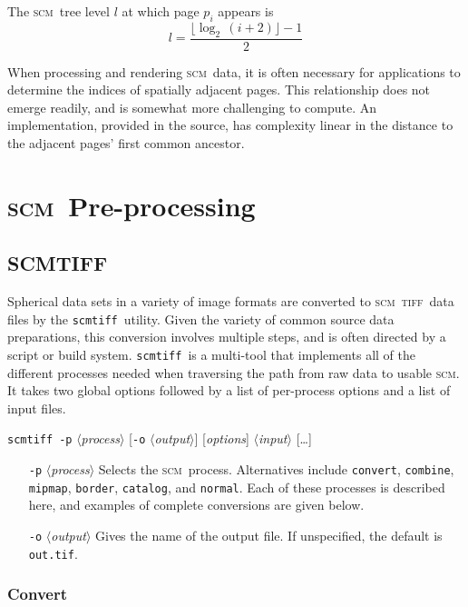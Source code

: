 \documentclass[oneside,11pt]{memoir}
\newcommand{\scm}     {\textsc{scm}}
\newcommand{\tiff}    {\textsc{tiff}}
\newcommand{\scmtiff} {\texttt{scmtiff}}
\newcommand{\inangles}[1]{$\langle$#1$\rangle$}
\begin{document}
\begin{Spacing}{1.1}
The \scm\ tree level $l$ at which page $p_i$ appears is
\[l=\frac{\lfloor\log_2\,(i+2)\rfloor - 1}{2}\]

When processing and rendering \scm\ data, it is often necessary for applications to determine the indices of spatially adjacent pages. This relationship does not emerge readily, and is somewhat more challenging to compute. An implementation, provided in the source, has complexity linear in the distance to the adjacent pages' first common ancestor.

\chapter{\scm\ Pre-processing}

\section{SCMTIFF}

Spherical data sets in a variety of image formats are converted to \scm\ \tiff\ data files by the \scmtiff\ utility. Given the variety of common source data preparations, this conversion involves multiple steps, and is often directed by a script or build system. \scmtiff\ is a multi-tool that implements all of the different processes needed when traversing the path from raw data to usable \scm. It takes two global options followed by a list of per-process options and a list of input files.

\bigskip\noindent\scmtiff\ \texttt{-p} \inangles{\textit{process}} [\texttt{-o} \inangles{\textit{output}}] [\textit{options}] \inangles{\textit{input}} [\ldots]

\begin{itemize}
\item[\texttt{-p} \inangles{\textit{process}}] Selects the \scm\ process. Alternatives include \texttt{convert}, \texttt{combine}, \texttt{mipmap}, \texttt{border}, \texttt{catalog}, and \texttt{normal}. Each of these processes is described here, and examples of complete conversions are given below.

\item[\texttt{-o} \inangles{\textit{output}}] Gives the name of the output file. If unspecified, the default is \texttt{out.tif}.
\end{itemize}

\subsection{Convert}


\end{Spacing}
\end{document}
